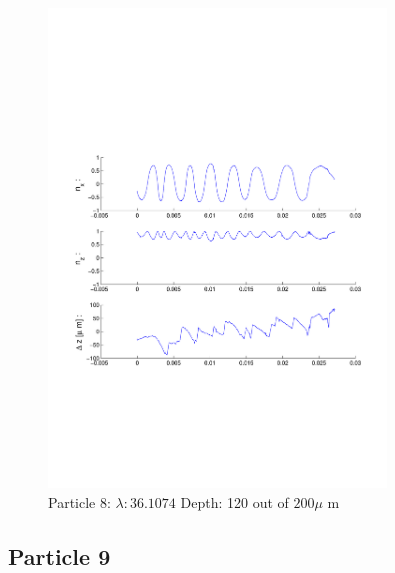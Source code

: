 \begin{figure}[H]

\includegraphics[width=0.8\textwidth]{Images/Particle 8/Particle8.pdf}

\caption{Particle 8:  $ \lambda: 36.1074$ Depth: 120 out of $200 \mu $ m}

\centering

\end{figure}

\subsection{Particle 9}

